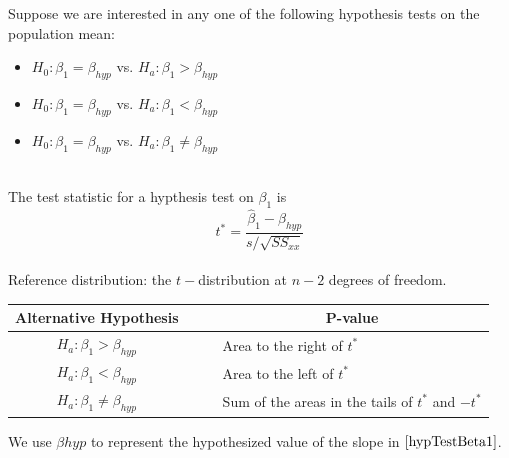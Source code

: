 \begin{hyp}
\label{hypTestBeta1}
Suppose we are interested in any one of the following hypothesis tests
on the population mean:\\

\begin{itemize}
\item	$H_{0} : \beta_{1} = \beta_{hyp}$  vs. $H_{a}  : \beta_{1} > \beta_{hyp}$
\item	$H_{0} : \beta_{1} = \beta_{hyp}$  vs. $H_{a}  : \beta_{1} < \beta_{hyp}$
\item	$H_{0} : \beta_{1} = \beta_{hyp}$  vs. $H_{a}  : \beta_{1} \neq \beta_{hyp}$
\end{itemize}

\hfill\\
The test statistic for a hypthesis test on $\beta_{1}$ is
\begin{equation}
t^{*}	 =   \frac{ \hat{\beta}_{1} - \beta_{hyp} }{ s / \sqrt{ SS_{xx} } }
\end{equation}
\hfill\\
Reference distribution: the $t-$distribution at $n-2$ degrees of freedom.\\

\begin{center}
\begin{tabular}{ccl}
Alternative Hypothesis	&	~\quad~	&	\multicolumn{1}{c}{P-value}	\\
\hline
$H_{a}  : \beta_{1} > \beta_{hyp}$		&	&	Area to the right of $t^{*}$	\\
$H_{a}  : \beta_{1} < \beta_{hyp}$		&	&	Area to the left of $t^{*}$	\\
$H_{a}  : \beta_{1} \neq \beta_{hyp}$		&	&	Sum of the areas in the tails of $t^{*}$ and $-t^{*}$
\end{tabular}
\end{center}

\end{hyp}


\begin{nt}
We use $\beta{hyp}$ to represent the hypothesized value of the slope in
$\ref{hypTestBeta1}$.
\end{nt}

